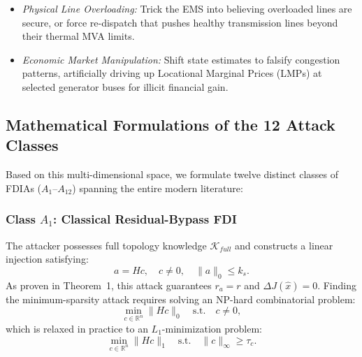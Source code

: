\documentclass[journal,compsoc]{IEEEtran}
\begin{document}
\begin{enumerate}
\begin{itemize}
        \item \textit{Physical Line Overloading:} Trick the EMS into believing overloaded lines are secure, or force re-dispatch that pushes healthy transmission lines beyond their thermal MVA limits.
        \item \textit{Economic Market Manipulation:} Shift state estimates to falsify congestion patterns, artificially driving up Locational Marginal Prices (LMPs) at selected generator buses for illicit financial gain.
    \end{itemize}
\end{enumerate}

\subsection{Mathematical Formulations of the 12 Attack Classes}
Based on this multi-dimensional space, we formulate twelve distinct classes of FDIAs ($A_1$--$A_{12}$) spanning the entire modern literature:

\subsubsection{Class $A_1$: Classical Residual-Bypass FDI \cite{ref29, ref6, ref8, ref50, ref51}}
The attacker possesses full topology knowledge $\mathcal{K}_{full}$ and constructs a linear injection satisfying:
\begin{equation}
    a = Hc, \quad c \ne 0, \quad \|a\|_0 \le k_s.
\end{equation}
As proven in Theorem~1, this attack guarantees $r_a = r$ and $\Delta J(\hat{x}) = 0$. Finding the minimum-sparsity attack requires solving an NP-hard combinatorial problem:
\begin{equation}
    \min_{c \in \mathbb{R}^n} \|Hc\|_0 \quad \text{s.t.} \quad c \ne 0,
\end{equation}
which is relaxed in practice to an $L_1$-minimization problem:
\begin{equation}
    \min_{c \in \mathbb{R}^n} \|Hc\|_1 \quad \text{s.t.} \quad \|c\|_\infty \ge \tau_c.
\end{equation}
\end{document}
